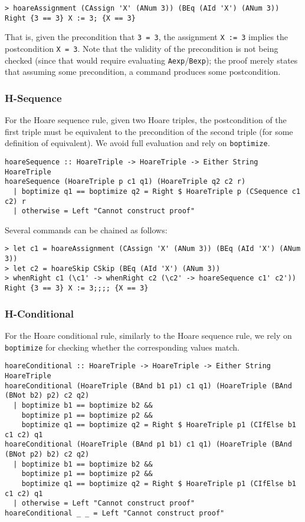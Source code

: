\documentclass{article}
\theoremstyle{definition}
\begin{document}
\begin{lstlisting}
> hoareAssignment (CAssign 'X' (ANum 3)) (BEq (AId 'X') (ANum 3))
Right {3 == 3} X := 3; {X == 3}
\end{lstlisting}

That is, given the precondition that \texttt{3 = 3}, the assignment \texttt{X := 3} implies the postcondition \texttt{X = 3}. Note that the validity of the precondition is not being checked (since that would require evaluating \texttt{Aexp}/\texttt{Bexp}); the proof merely states that assuming some precondition, a command produces some postcondition.

\subsubsection{H-Sequence}

For the Hoare sequence rule, given two Hoare triples, the postcondition of the first triple must be equivalent to the precondition of the second triple (for some definition of equivalent). We avoid full evaluation and rely on \texttt{boptimize}.

\begin{lstlisting}
hoareSequence :: HoareTriple -> HoareTriple -> Either String HoareTriple
hoareSequence (HoareTriple p c1 q1) (HoareTriple q2 c2 r)
  | boptimize q1 == boptimize q2 = Right $ HoareTriple p (CSequence c1 c2) r
  | otherwise = Left "Cannot construct proof"
\end{lstlisting}

Several commands can be chained as follows:

\begin{lstlisting}
> let c1 = hoareAssignment (CAssign 'X' (ANum 3)) (BEq (AId 'X') (ANum 3))
> let c2 = hoareSkip CSkip (BEq (AId 'X') (ANum 3))
> whenRight c1 (\c1' -> whenRight c2 (\c2' -> hoareSequence c1' c2'))
Right {3 == 3} X := 3;;;; {X == 3}
\end{lstlisting}

\subsubsection{H-Conditional}

For the Hoare conditional rule, similarly to the Hoare sequence rule, we rely on \texttt{boptimize} for checking whether the corresponding values match.

\begin{lstlisting}
hoareConditional :: HoareTriple -> HoareTriple -> Either String HoareTriple
hoareConditional (HoareTriple (BAnd b1 p1) c1 q1) (HoareTriple (BAnd (BNot b2) p2) c2 q2)
  | boptimize b1 == boptimize b2 &&
    boptimize p1 == boptimize p2 &&
    boptimize q1 == boptimize q2 = Right $ HoareTriple p1 (CIfElse b1 c1 c2) q1
hoareConditional (HoareTriple (BAnd p1 b1) c1 q1) (HoareTriple (BAnd (BNot p2) b2) c2 q2)
  | boptimize b1 == boptimize b2 &&
    boptimize p1 == boptimize p2 &&
    boptimize q1 == boptimize q2 = Right $ HoareTriple p1 (CIfElse b1 c1 c2) q1
  | otherwise = Left "Cannot construct proof"
hoareConditional _ _ = Left "Cannot construct proof"
\end{lstlisting}
\end{document}
